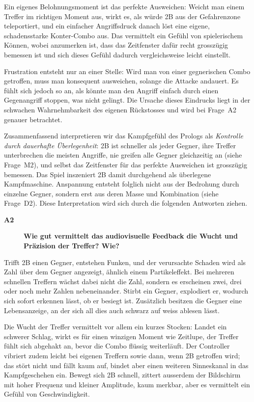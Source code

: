 \documentclass[../Main.tex]{subfiles}
\begin{document}
Ein eigenes Belohnungsmoment ist das perfekte Ausweichen: Weicht man einem Treffer im richtigen Moment aus, wirkt es, als würde 2B aus der Gefahrenzone teleportiert, und ein einfacher Angriffsdruck danach löst eine eigene, schadensstarke Konter-Combo aus. Das vermittelt ein Gefühl von spielerischem Können, wobei anzumerken ist, dass das Zeitfenster dafür recht grosszügig bemessen ist und sich dieses Gefühl dadurch vergleichsweise leicht einstellt.

Frustration entsteht nur an einer Stelle: Wird man von einer gegnerischen Combo getroffen, muss man konsequent ausweichen, solange die Attacke andauert. Es fühlt sich jedoch so an, als könnte man den Angriff einfach durch einen Gegenangriff stoppen, was nicht gelingt. Die Ursache dieses Eindrucks liegt in der schwachen Wahrnehmbarkeit des eigenen Rückstosses und wird bei Frage~A2 genauer betrachtet.

Zusammenfassend interpretieren wir das Kampfgefühl des Prologs als \textit{Kontrolle durch dauerhafte Überlegenheit}: 2B ist schneller als jeder Gegner, ihre Treffer unterbrechen die meisten Angriffe, nie greifen alle Gegner gleichzeitig an (siehe Frage~M2), und selbst das Zeitfenster für das perfekte Ausweichen ist grosszügig bemessen. Das Spiel inszeniert 2B damit durchgehend als überlegene Kampfmaschine. Anspannung entsteht folglich nicht aus der Bedrohung durch einzelne Gegner, sondern erst aus deren Masse und Kombination (siehe Frage~D2). Diese Interpretation wird sich durch die folgenden Antworten ziehen.

\begin{description}
    \item[\textbf{A2}] \textbf{Wie gut vermittelt das audiovisuelle Feedback die Wucht und Präzision der Treffer? Wie?}
\end{description}

Trifft 2B einen Gegner, entstehen Funken, und der verursachte Schaden wird als Zahl über dem Gegner angezeigt, ähnlich einem Partikeleffekt. Bei mehreren schnellen Treffern wächst dabei nicht die Zahl, sondern es erscheinen zwei, drei oder noch mehr Zahlen nebeneinander. Stirbt ein Gegner, explodiert er, wodurch sich sofort erkennen lässt, ob er besiegt ist. Zusätzlich besitzen die Gegner eine Lebensanzeige, an der sich all dies auch schwarz auf weiss ablesen lässt.

Die Wucht der Treffer vermittelt vor allem ein kurzes Stocken: Landet ein schwerer Schlag, wirkt es für einen winzigen Moment wie Zeitlupe, der Treffer fühlt sich abgehakt an, bevor die Combo flüssig weiterläuft. Der Controller vibriert zudem leicht bei eigenen Treffern sowie dann, wenn 2B getroffen wird; das stört nicht und fällt kaum auf, bindet aber einen weiteren Sinneskanal in das Kampfgeschehen ein. Bewegt sich 2B schnell, zittert ausserdem der Bildschirm mit hoher Frequenz und kleiner Amplitude, kaum merkbar, aber es vermittelt ein Gefühl von Geschwindigkeit.
\end{document}

